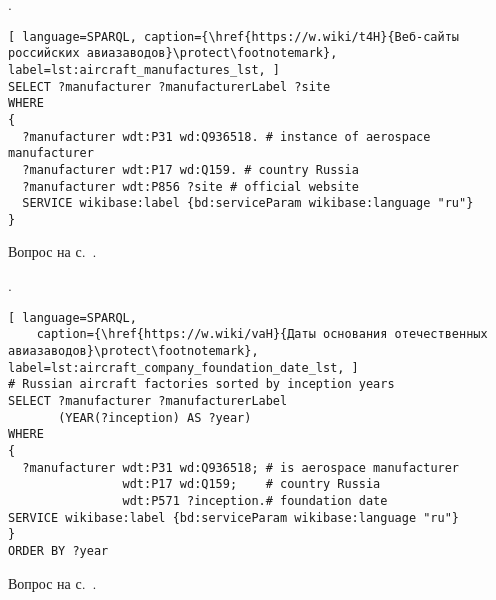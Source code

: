 %




\begin{task}
    \label{answer:aircraft_manufacturers}
    . 
    
	\begin{lstlisting}[ language=SPARQL, caption={\href{https://w.wiki/t4H}{Веб-сайты российских авиазаводов}\protect\footnotemark}, label=lst:aircraft_manufactures_lst, ]
SELECT ?manufacturer ?manufacturerLabel ?site
WHERE
{
  ?manufacturer wdt:P31 wd:Q936518. # instance of aerospace manufacturer
  ?manufacturer wdt:P17 wd:Q159. # country Russia
  ?manufacturer wdt:P856 ?site # official website
  SERVICE wikibase:label {bd:serviceParam wikibase:language "ru"}
}
\end{lstlisting}
    
    \small{Вопрос на с.~\pageref{lst:lang2}.}
\end{task}

\begin{task}
    \label{answer:aircraft_company_foundation_date}
    . 
    
	\begin{lstlisting}[ language=SPARQL, 
    caption={\href{https://w.wiki/vaH}{Даты основания отечественных авиазаводов}\protect\footnotemark}, label=lst:aircraft_company_foundation_date_lst, ]
# Russian aircraft factories sorted by inception years
SELECT ?manufacturer ?manufacturerLabel
       (YEAR(?inception) AS ?year)
WHERE
{
  ?manufacturer wdt:P31 wd:Q936518; # is aerospace manufacturer
                wdt:P17 wd:Q159;    # country Russia
                wdt:P571 ?inception.# foundation date
SERVICE wikibase:label {bd:serviceParam wikibase:language "ru"}
}
ORDER BY ?year
\end{lstlisting}
    
    \small{Вопрос на с.~\pageref{aircraft_question_2}.}
\end{task}

